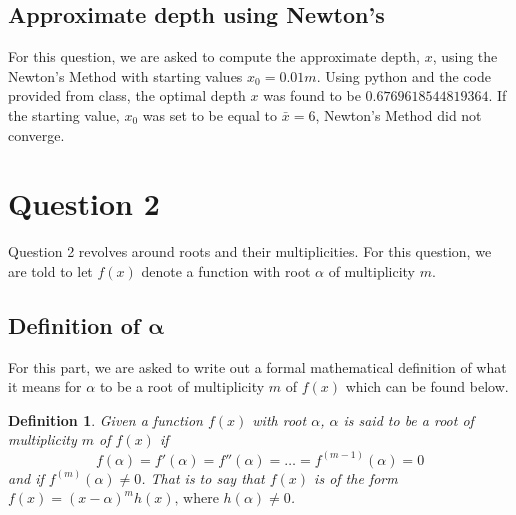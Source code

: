 \documentclass{article}
\newtheorem{definition}{Definition}
\begin{document}
\subsection{Approximate depth using Newton's}
For this question, we are asked to compute the approximate depth, \(x\), using the Newton's Method with starting values \(x_0=0.01m\). Using python and the code provided from class, the optimal depth \(x\) was found to be \(0.6769618544819364\). If the starting value, \(x_0\) was set to be equal to \(\bar{x}=6\), Newton's Method did not converge.


\section{Question 2}
Question 2 revolves around roots and their multiplicities. For this question, we are told to let \(f(x)\) denote a function with root \(\alpha\) of multiplicity \(m\).
\subsection{Definition of \(\mathbf{\alpha}\)}
For this part, we are asked to write out a formal mathematical definition of what it means for \(\alpha\) to be a root of multiplicity \(m\) of \(f(x)\) which can be found below.
\begin{definition}
    Given a function \(f(x)\) with root \(\alpha\), \(\alpha\) is said to be a root of multiplicity \(m\) of \(f(x)\) if
    \[
    f(\alpha) = f'(\alpha) = f''(\alpha) = \dots = f^{(m-1)}(\alpha) = 0
    \]
    and if \(f^{(m)}(\alpha)\neq0\). That is to say that \(f(x)\) is of the form \(f(x)=(x-\alpha)^mh(x) \mbox{, where } h(\alpha) \neq 0\).
\end{definition}
\end{document}

